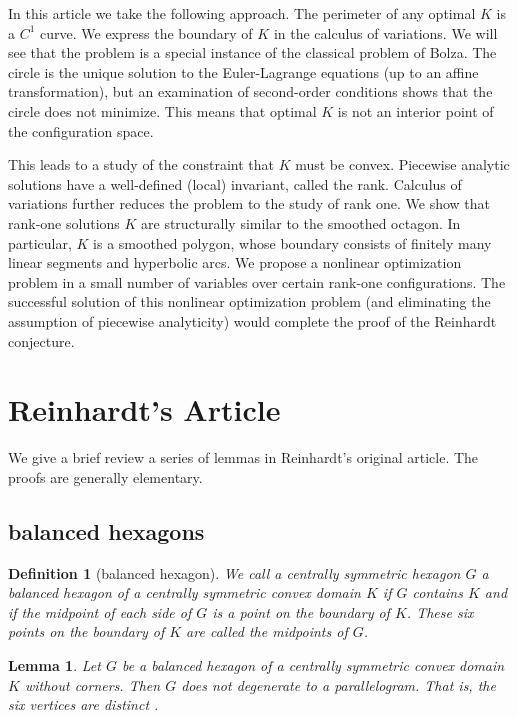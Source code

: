\documentclass[11pt]{amsart}
\newtheorem{definition}[equation]{Definition}
\newtheorem{lemma}[equation]{Lemma}
\begin{document}
In this article we take the following approach.  The perimeter of any
optimal $K$ is a $C^1$ curve.  We express the boundary of $K$ in the
calculus of variations.  We will see that the problem is a special
instance of the classical problem of Bolza.  The circle is the unique
solution to the Euler-Lagrange equations (up to an affine
transformation), but an examination of second-order conditions shows
that the circle does not minimize.  This means that optimal $K$ is not
an interior point of the configuration space.


This leads to a study of the constraint that $K$ must be convex.
Piecewise analytic solutions have a well-defined (local) invariant,
called the rank.  Calculus of variations further reduces the problem
to the study of rank one.  We show that rank-one solutions $K$ are
structurally similar to the smoothed octagon.  In particular, $K$ is a
smoothed polygon, whose boundary consists of finitely many linear
segments and hyperbolic arcs.  We propose a nonlinear optimization
problem in a small number of variables over certain rank-one
configurations.  The successful solution of this nonlinear
optimization problem (and eliminating the assumption of piecewise
analyticity) would complete the proof of the Reinhardt conjecture.




\section{Reinhardt's Article}\label{sec:rein}

We give a brief review a series of lemmas in Reinhardt's original article.
The proofs are generally elementary.


\subsection{balanced hexagons}

%
\begin{definition}[balanced hexagon]
  We call a centrally symmetric hexagon $G$ a {\it balanced hexagon}
  of a centrally symmetric convex domain $K$ if $G$ contains $K$ and
  if the midpoint of each side of $G$ is a point on the boundary of
  $K$.  These six points on the boundary of $K$ are called the
  midpoints of $G$.
\end{definition}


\begin{lemma}\label{lemma:parallel} 
  Let $G$ be a balanced hexagon of a centrally symmetric convex domain
  $K$ without corners.  Then $G$ does not degenerate to a
  parallelogram.  That is, the six vertices are distinct \cite{R}.
\end{lemma}
\end{document}
